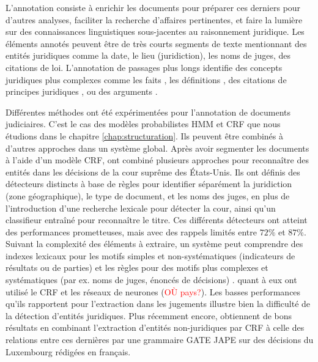 L'annotation consiste à enrichir les documents pour préparer ces derniers pour d'autres analyses, faciliter la recherche d'affaires pertinentes, et faire la lumière sur des connaissances linguistiques sous-jacentes au raisonnement juridique. Les éléments annotés peuvent être de très courts segments de texte mentionnant des entités juridiques \citep{Waltl2016lexia, wyner2010extractlegalelts} comme la date, le lieu (juridiction), les noms de juges, des citations de loi.  L'annotation de passages plus longs identifie des concepts juridiques plus complexes comme les faits \citep{wyner2010extractlegalelts, wyner2010casefactors, Shulayeva2017recognfactprincip}, les définitions \citep{Waltl2016lexia}, des citations de principes juridiques \citep{Shulayeva2017recognfactprincip}, ou des arguments \citep{WynerMoens2010mineargument}. 

Différentes méthodes ont été expérimentées pour l'annotation de documents judiciaires. C'est le cas des modèles probabilistes HMM et CRF que nous étudions dans le chapitre \ref{chap:structuration}. Ils peuvent être combinés à d'autres approches dans un système global. Après avoir segmenter les documents à l'aide d'un modèle CRF, \citet{dozier2010legalnerr} ont combiné plusieurs approches pour reconnaître des entités dans les décisions de la cour suprême des États-Unis. Ils ont définis des détecteurs distincts à base de règles pour identifier séparément la juridiction (zone géographique), le type de document, et les noms des juges, en plus de l'introduction d'une recherche lexicale pour détecter la cour, ainsi qu'un classifieur entraîné pour reconnaître le titre. Ces différents détecteurs ont atteint des performances prometteuses, mais avec des rappels limités entre $ 72 \% $ et $ 87 \% $. Suivant la complexité des éléments à extraire, un système peut comprendre des indexes lexicaux pour les motifs simples et non-systématiques (indicateurs de résultats ou de parties) et les règles pour des motifs plus complexes et systématiques (par ex. noms de juges, énoncés de décisions) \citep{Waltl2016lexia, wyner2010extractlegalelts}. \cite{cardellino2017legalNERCL} quant à eux ont utilisé le CRF et les réseaux de neurones (\textcolor{red}{OÙ pays?}). Les basses performances qu'ils rapportent pour l'extraction dans les jugements illustre bien la difficulté de la détection d'entités juridiques. Plus récemment encore, \citet{andrew2018legalNerAndRelation} obtiennent de bons résultats en combinant l'extraction d'entités non-juridiques par CRF à celle des relations entre ces dernières par une grammaire GATE JAPE \citep{thakker2009gatejape} sur des décisions du Luxembourg rédigées en français.

